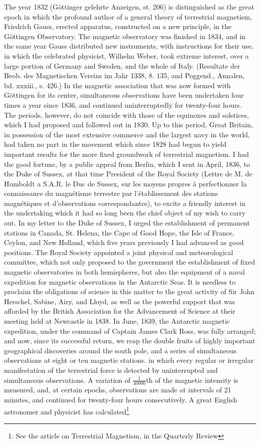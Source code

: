 {The year 1832 (Göttinger gelehrte Anzeigen, st. 206) is distinguished as the great epoch in which the profound author of a general theory of terrestrial magnetism, Friedrich Gauss, erected apparatus, constructed on a new principle, in the Göttingen Observatory. The magnetic observatory was finished in 1834, and in the same year Gauss distributed new instruments, with instructions for their use, in which the celebrated physicist, Wilhelm Weber, took extreme interest, over a large portion of Germany and Sweden, and the whole of Italy. (Resultate der Beob. des Magnetischen Vereins im Jahr 1338, 8. 135, and Poggend., Annalen, bd. xxxiii., s. 426.) In the magnetic association that was now formed with Göttingen for its center, simultaneous observations have been undertaken four times a year since 1836, and continued uninterruptedly for twenty-four hours. The periods, however, do not coincide with those of the equinoxes and solstices, which I had proposed and followed out in 1830. Up to this period, Great Britain, in possession of the most extensive commerce and the largest navy in the world, had taken no part in the movement which since 1828 had begun to yield important results for the more fixed groundwork of terrestrial magnetism. I had the good fortune, by a public appeal from Berlin, which I sent in April, 1836, to the Duke of Sussex, at that time President of the Royal Society (Lettre de M. de Humboldt a S.A.R. le Duc de Sussex, sur les moyens propres à perfectionner la connaissance du magnétisme terrestre par l'établissement des stations magnétiques et d'observations correspondantes), to excite a friendly interest in the undertaking which it had so long been the chief object of my wish to carry out. In my letter to the Duke of Sussex, I urged the establishment of permanent stations in Canada, St. Helena, the Cape of Good Hope, the Isle of France, Ceylon, and New Holland, which five years previously I had advanced as good positions. The Royal Society appointed a joint physical and meteorological committee, which not only proposed to the government the establishment of fixed magnetic observatories in both hemispheres, but also the equipment of a naval expedition for magnetic observations in the Antarctic Seas. It is needless to proclaim the obligations of science in this matter to the great activity of Sir John Herschel, Sabine, Airy, and Lloyd, as well as the powerful support that was afforded by the British Association for the Advancement of Science at their meeting held at Newcastle in 1838. In June, 1839, the Antarctic magnetic expedition, under the command of Captain James Clark Ross, was fully arranged; and now, since its successful return, we reap the double fruits of highly important geographical discoveries around the south pole, and a series of simultaneous observations at eight or ten magnetic stations.} in which every regular or irregular manifestation of the terrestrial force is detected by uninterrupted and simultaneous observations. A variation of $\frac{1}{40000}$th of the magnetic intensity is measured, and, at certain epochs, observations are made at intervals of 21 minutes, and continued for twenty-four hours consecutively. A great English astronomer and physicist has calculated\footnote{See the article on Terrestrial Magnetism, in the Quarterly Review }

